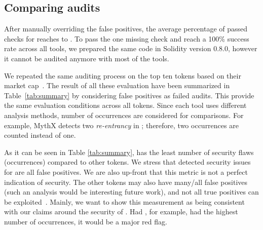 
\subsection{Comparing audits}
After manually overriding the false positives, the average percentage of passed checks for \sys reaches to \prct. To pass the one missing check and reach a 100\% success rate across all tools, we prepared the same code in Solidity version 0.8.0, however it cannot be audited anymore with most of the tools. 

We repeated the same auditing process on the top ten tokens based on their market cap~\cite{EtherScan}. The result of all these evaluation have been summarized in Table~\ref{tab:summary} by considering false positives as failed audits. This provide the same evaluation conditions across all tokens. Since each tool uses different analysis methods, number of occurrences are considered for comparisons. For example, MythX detects two \textit{re-entrancy} in \sys; therefore, two occurrences are counted instead of one. 


As it can be seen in Table \ref{tab:summary}, \sys has the least number of security flaws (occurrences) compared to other tokens. We stress that detected security issues for \sys are all false positives. We are also up-front that this metric is not a perfect indication of security.  The other tokens may also have many/all false positives (such an analysis would be interesting future work), and not all true positives can be exploited~\cite{VulExp}. Mainly, we want to show this measurement as being consistent with our claims around the security of \sys. Had \sys, for example, had the highest number of occurrences, it would be a major red flag.



